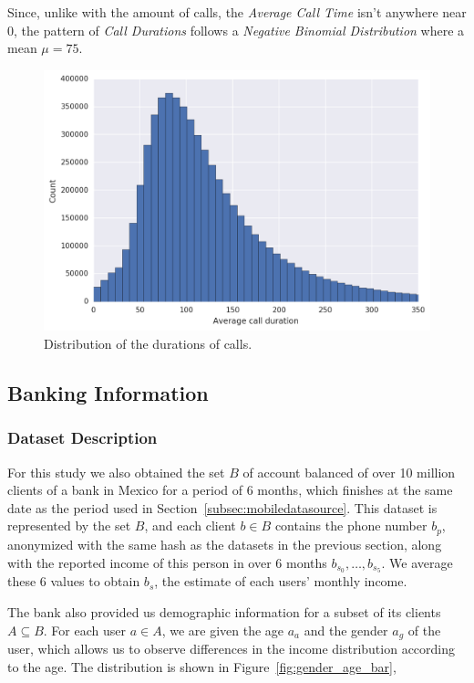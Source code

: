 Since, unlike with the amount of calls, the \emph{Average Call Time} isn't anywhere near 0, the pattern of \emph{Call Durations} follows a \emph{Negative Binomial Distribution} where a mean $\mu = 75$.

\begin{figure}
\centering
\includegraphics[width=.75\textwidth]{figures/callduration.png}
\caption{Distribution of the durations of calls.}
\label{fig:callduration}
\end{figure}

\subsection{Banking Information}
\label{subsec:bank_source}

\subsubsection{Dataset Description}

For this study we also obtained the set $B$ of account balanced of over 10 million clients of a bank in Mexico for a period of 6 months, which finishes at the same date as the period used in Section~\ref{subsec:mobiledatasource}. This dataset is represented by the set $B$, and each client $b \in B$ contains the phone number $b_p$, anonymized with the same hash as the datasets in the previous section, along with the reported income of this person in over 6 months $b_{s_0}, \ldots, b_{s_5}$. We average these 6 values to obtain $b_s$, the estimate of each users' monthly income.

The bank also provided us demographic information for a subset of its clients $A \subseteq B$. For each user $a \in A$, we are given the age $a_a$ and the gender $a_g$ of the user, which allows us to observe differences in the income distribution according to the age. The distribution is shown in Figure~\ref{fig:gender_age_bar}, 

